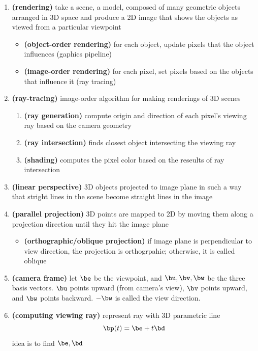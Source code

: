 \documentclass[11pt]{article}
\newcommand{\bheading}[1]{\textbf{(#1)}}
\begin{document}
\begin{enumerate}
    \item \bheading{rendering} take a scene, a model, composed of many geometric objects arranged in 3D space and produce a 2D image that shows the objects as viewed from a particular viewpoint
    \begin{itemize}
        \item \bheading{object-order rendering} for each object, update pixels that the object influences (gaphics pipeline)
        \item \bheading{image-order rendering} for each pixel, set pixels based on the objects that influence it (ray tracing)
    \end{itemize}
    \item \bheading{ray-tracing} image-order algorithm for making renderings of 3D scenes
    \begin{enumerate}
        \item \bheading{ray generation} compute origin and direction of each pixel's viewing ray based on the camera geometry
        \item \bheading{ray intersection} finds closest object intersecting the viewing ray
        \item \bheading{shading} computes the pixel color based on the reseults of ray intersection
    \end{enumerate}
    \item \bheading{linear perspective} 3D objects projected to image plane in such a way that stright lines in the scene become straight lines in the image
    \item \bheading{parallel projection} 3D points are mapped to 2D by moving them along a projection direction until they hit the image plane
    \begin{itemize}
        \item \bheading{orthographic/oblique projection} if image plane is perpendicular to view direction, the projection is orthogrpahic; otherwise, it is called oblique
    \end{itemize}
    \item \bheading{camera frame} let $\be$ be the viewpoint, and $\bu,\bv,\bw$ be the three basis vectors. $\bu$ points upward (from camera's view), $\bv$ points upward, and $\bw$ points backward. $-\bw$ is called the view direction.
    \item \bheading{computing viewing ray} represent ray with 3D parametric line
    \[
        \bp(t) = \be + t\bd
    \]
    idea is to find $\be,\bd$

\end{enumerate}
\end{document}
